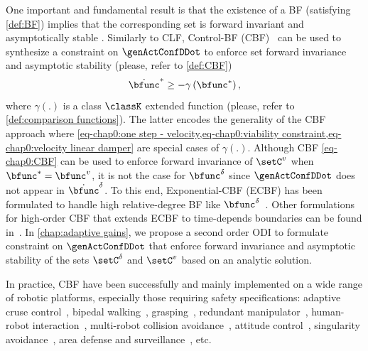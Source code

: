 One important and fundamental result is that the existence of a BF (satisfying \cref{def:BF}) implies that the corresponding set is forward invariant and asymptotically stable \cite[Propositions 1 \& 2]{ames2017tac}. Similarly to CLF, Control-BF (CBF)~\cite{wieland2007ifac} can be used to synthesize a constraint on $\genActConfDDot$ to enforce set forward invariance and asymptotic stability (please, refer to \cref{def:CBF})  
\begin{equation}\label{eq-chap0:CBF}
	\dot{\bfunc}^{*}  \geq -\gamma\left(\bfunc^*\right),
\end{equation}
where $\gamma(.)$ is a class $\classK$ extended function (please, refer to \cref{def:comparison functions}). The latter encodes the generality of the CBF approach where  \cref{eq-chap0:one step - velocity,eq-chap0:viability constraint,eq-chap0:velocity linear damper} are special cases of $\gamma(.)$. Although CBF \cref{eq-chap0:CBF} can be used to enforce forward invariance of $\setC^v$ when $\bfunc^* = \bfunc^{v}$, it is not the case for $\bfunc^{\delta}$ since $\genActConfDDot$ does not appear in $\dot{\bfunc}^{\delta}$. 
To this end, Exponential-CBF (ECBF) has been formulated to handle high relative-degree BF like $\bfunc^{\delta}$~\cite{nguyen2016acc,ames2019ecc}.
Other formulations for high-order CBF that extends ECBF to time-depends boundaries can be found in~\cite{tan2021tac,xiao2021tac,wang2022isaTransactions}.
In \cref{chap:adaptive gains}, we propose a second order ODI to formulate constraint on $\genActConfDDot$ that enforce forward invariance and asymptotic stability of the sets $\setC^{\delta}$ and $\setC^{v}$ based on an analytic solution. %
 
 In practice, CBF have been successfully and mainly implemented on a wide range of robotic platforms, especially those requiring safety specifications: adaptive cruse control~\cite{ames2014cdc}, bipedal walking~\cite{hsu2015acc,nguyen2016acc}, grasping~\cite{cortez2021tcst}, redundant manipulator~\cite{rauscher2016iros,saveriano2019iros,murtaza2022ral}, human-robot interaction~\cite{landi2019ecc}, multi-robot collision avoidance~\cite{wang2017tro,borrmann2015ifac},  attitude control~\cite{tan2020cdc}, singularity avoidance~\cite{kurtz2021cdc}, area defense and surveillance~\cite{guerrero-bonilla2021iros}, etc.  




